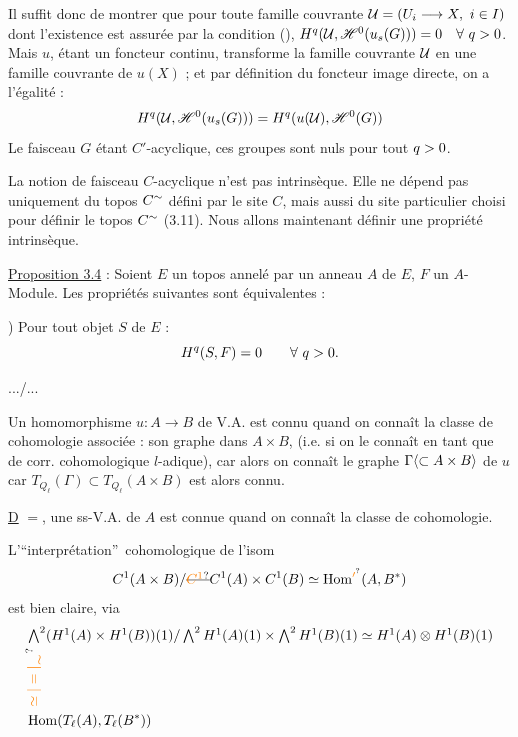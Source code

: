 Il suffit donc de montrer que pour toute famille couvrante $\mathcal U=(U_i\longrightarrow X,\ i\in I)$ dont l'existence est assurée par la condition (), $H^q(\handwritten{\mathcal U},\handwritten{\mathscr H}^{0}(u_s(G)))=0\quad\handwritten{\forall}\ q\handwritten{>}0$. Mais $u$, étant un foncteur continu, transforme la famille couvrante $\mathcal U$ en une famille couvrante de $u(X)$ ; et par définition du foncteur image directe, on a l'égalité :
\[
 H^q(\mathcal U,\mathscr H^{0}(u_s(G))) =
 H^q(u(\mathcal U),\mathscr H^{0}(G))
\]
Le faisceau $G$ étant $C'$-acyclique, ces groupes sont nuls pour tout $q>0$. 

La notion de faisceau $C$-acyclique n'est pas intrinsèque. Elle ne dépend pas uniquement du topos $C^{\sim}$ défini par le site $C$, mais aussi du site particulier choisi pour définir le topos $C^{\sim}$ (3.11). Nous allons maintenant définir une propriété intrinsèque.

\uline{Proposition 3.4} : Soient $E$ un topos annelé par un anneau $A$ de $E$, $F$ un $A$-Module. Les propriétés suivantes sont équivalentes :

) Pour tout objet $S$ de $E$ :
\[
 H^q(S,F)=0 \qquad \handwritten{\forall}\ q\handwritten{>}0\handwritten{.}
\]

\hfill .../...

Un homomorphisme $u:A\to B$ de V.A. est connu quand on connaît la classe de cohomologie associée : son graphe dans $A\times B$,  (i.e. si on le connaît en tant que  de corr. cohomologique $l$-adique), car alors on connaît le graphe $\Gamma\inserted{\subset A\times B}$ de $u$ car $T_{Q_\ell}(\Gamma)\subset T_{Q_\ell}(A\times B)$ est alors connu.

\uline{D} $=$, une ss-V.A. de $A$ est connue quand on connaît la classe de cohomologie.

L'\textquotedblleft interprétation\textquotedblright\ cohomologique de l'isom
\[
 C^1(A\times B)/\deleted{\unsure{C^1}} C^1(A)\times C^1(B)\simeq\operatorname{Hom}^{\unsure{\prime}}(A,B^*)
\]
est bien claire, via
\[
\begin{aligned}
&\textstyle\bigwedge^2(H^1(A)\times H^1(B))(1)/\bigwedge^2 H^1(A)(1)\times\bigwedge^2 H^1(B)(1)
 \simeq H^1(A)\otimes H^1(B)(1)\\[-2pt]
&\hfill \rotatebox{90}{$\unsure{\simeq|=|\rotatebox{-90}{$\wr$}}$}\qquad\\[-2pt]
&\hfill \operatorname{Hom}(T_\ell(A),T_\ell(B^*))
\end{aligned}
\]

